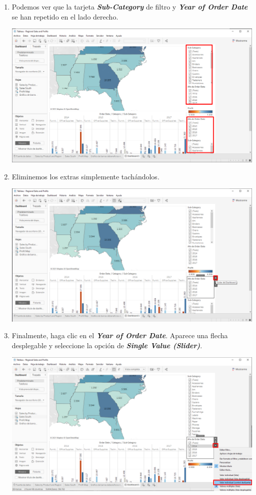 \documentclass[12pt,letterpaper]{article}
\begin{document}
\begin{enumerate}
\begin{center}
        \end{center}
        \item Podemos ver que la tarjeta \textit{\textbf{Sub-Category}} de filtro y \textit{\textbf{Year of Order Date}} se han repetido en el lado derecho.
        \begin{center}
            \includegraphics[width=15cm]{./img/img75.png}
        \end{center}
        \item Eliminemos los extras simplemente tachándolos.
        \begin{center}
            \includegraphics[width=15cm]{./img/img76.png}
        \end{center}
        \item Finalmente, haga clic en el \textit{\textbf{Year of Order Date}}. Aparece una flecha desplegable y seleccione la opción de \textit{\textbf{Single Value (Slider)}}.
        \begin{center}
            \includegraphics[width=15cm]{./img/img77.png}

\end{center}
\end{enumerate}
\end{document}
